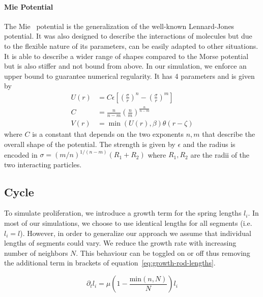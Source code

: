 \documentclass{article}
\begin{document}
\paragraph{Mie Potential}
The Mie~\cite{Mie1903} potential is the generalization of the well-known
Lennard-Jones~\cite{Jones1924} potential.
It was also designed to describe the interactions of molecules but due to the flexible nature of its
parameters, can be easily adapted to other situations.
It is able to describe a wider range of shapes compared to the Morse potential but is also stiffer
and not bound from above.
In our simulation, we enforce an upper bound to guarantee numerical regularity.
It has 4 parameters and is given by
\begin{align}
    U(r) &= C\epsilon\left[ \left(\frac{\sigma}{r}\right)^n -
        \left(\frac{\sigma}{r}\right)^m\right]\\
    C &= \frac{n}{n-m}\left(\frac{n}{m}\right)^{\frac{n}{n-m}}\\
    V(r) &= \min(U(r), \beta)\theta(r-\zeta)
\end{align}
where $C$ is a constant that depends on the two exponents $n,m$ that describe the overall shape of
the potential.
The strength is given by $\epsilon$ and the radius is encoded in $\sigma =
(m/n)^{1/(n-m)}(R_1+R_2)$ where $R_1,R_2$ are the radii of the two interacting particles.

\subsection{Cycle}

To simulate proliferation, we introduce a growth term for the spring lengths $l_i$.
In most of our simulations, we choose to use identical lengths for all segments (i.e. $l_i=l$).
However, in order to generalize our approach we assume that individual lengths of segments could
vary.
We reduce the growth rate with increasing number of neighbors $N$.
This behaviour can be toggled on or off thus removing the additional term in brackets of
equation~\ref{eq:growth-rod-lengths}.

\begin{equation}
    \partial_t l_i = \mu\left(1-\frac{\text{min}(n,N)}{N}\right)l_i
    \label{eq:growth-rod-lengths}
\end{equation}
\end{document}

